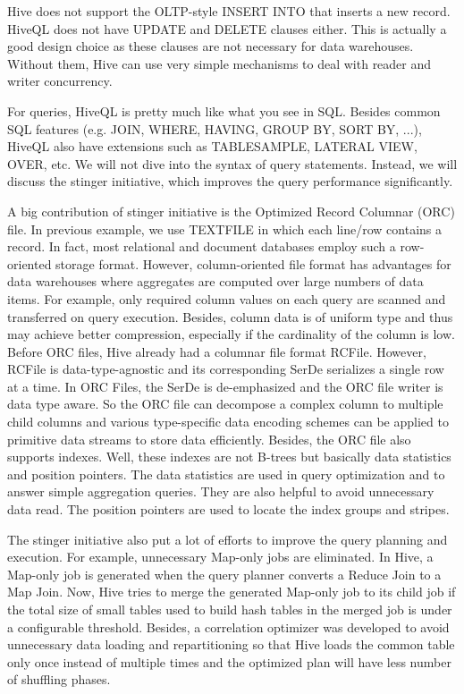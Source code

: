 \documentclass[12pt]{book}
\begin{document}
Hive does not support the OLTP-style INSERT INTO that inserts a new record. HiveQL does not have UPDATE and DELETE clauses either. This is actually a good design choice as these clauses are not necessary for data warehouses. Without them, Hive can use very simple mechanisms to deal with reader and writer concurrency.

For queries, HiveQL is pretty much like what you see in SQL. Besides common SQL features (e.g. JOIN, WHERE, HAVING, GROUP BY, SORT BY, ...), HiveQL also have extensions such as TABLESAMPLE, LATERAL VIEW, OVER, etc. We will not dive into the syntax of query statements. Instead, we will discuss the stinger initiative, which improves the query performance significantly.

A big contribution of stinger initiative is the Optimized Record Columnar (ORC) file. In previous example, we use TEXTFILE in which each line/row contains a record. In fact, most relational and document databases employ such a row-oriented storage format. However, column-oriented file format has advantages for data warehouses where aggregates are computed over large numbers of data items. For example, only required column values on each query are scanned and transferred on query execution. Besides, column data is of uniform type and thus may achieve better compression, especially if the cardinality of the column is low. Before ORC files, Hive already had a columnar file format RCFile. However, RCFile is data-type-agnostic and its corresponding SerDe serializes a single row at a time. In ORC Files, the SerDe is de-emphasized and the ORC file writer is data type aware. So the ORC file can decompose a complex column to multiple child columns and various type-specific data encoding schemes can be applied to primitive data streams to store data efficiently. Besides, the ORC file also supports indexes. Well, these indexes are not B-trees but basically data statistics and position pointers. The data statistics are used in query optimization and to answer simple aggregation queries. They are also helpful to avoid unnecessary data read. The position pointers are used to locate the index groups and stripes.

The stinger initiative also put a lot of efforts to improve the query planning and execution. For example, unnecessary Map-only jobs are eliminated. In Hive, a Map-only job is generated when the query planner converts a Reduce Join to a Map Join. Now, Hive tries to merge the generated Map-only job to its child job if the total size of small tables used to build hash tables in the merged job is under a configurable threshold. Besides, a correlation optimizer was developed to avoid unnecessary data loading and repartitioning so that Hive loads the common table only once instead of multiple times and the optimized plan will have less number of shuffling phases.
\end{document}
